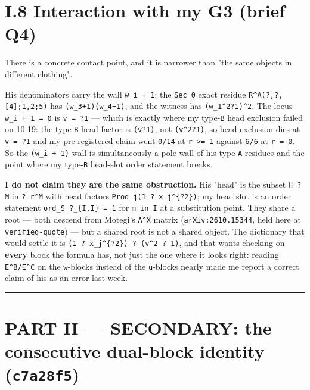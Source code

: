 \documentclass[11pt,a4paper]{article}
\begin{document}
\section*{I.8 Interaction with my G3 (brief Q4)}

There is a concrete contact point, and it is narrower than "the same objects in different clothing".

His denominators carry the wall \mbox{\texttt{w\_i + 1}}: the \mbox{\texttt{Sec 0}} exact residue \mbox{\texttt{R\textasciicircum{}A(?,?,[4];1,2;5)}} has \mbox{\texttt{(w\_3+1)(w\_4+1)}}, and the witness has \mbox{\texttt{(w\_1\textasciicircum{}2?1)\textasciicircum{}2}}. The locus \mbox{\texttt{w\_i + 1 = 0}} is \mbox{\texttt{v = ?1}} --- which is exactly where my type-\mbox{\texttt{B}} head exclusion failed on 10-19: the type-\mbox{\texttt{B}} head factor is \mbox{\texttt{(v?1)}}, not \mbox{\texttt{(v\textasciicircum{}2?1)}}, so head exclusion dies at \mbox{\texttt{v = ?1}} and my pre-registered claim went \mbox{\texttt{0/14}} at \mbox{\texttt{r >= 1}} against \mbox{\texttt{6/6}} at \mbox{\texttt{r = 0}}. So the \mbox{\texttt{(w\_i + 1)}} wall is simultaneously a pole wall of his type-\mbox{\texttt{A}} residues and the point where my type-\mbox{\texttt{B}} head-slot order statement breaks.

\textbf{I do not claim they are the same obstruction.} His "head" is the subset \mbox{\texttt{H ? M}} in \mbox{\texttt{?\_r\textasciicircum{}M}} with head factors \mbox{\texttt{Prod\_j(1 ? x\_j\textasciicircum{}\{?2\})}}; my head slot is an order statement \mbox{\texttt{ord\_S ?\_\{I,I\} = 1}} for \mbox{\texttt{m in I}} at a substitution point. They share a root --- both descend from Motegi's \mbox{\texttt{A\textasciicircum{}X}} matrix (\mbox{\texttt{arXiv:2610.15344}}, held here at \mbox{\texttt{verified-quote}}) --- but a shared root is not a shared object. The dictionary that would settle it is \mbox{\texttt{(1 ? x\_j\textasciicircum{}\{?2\}) ? (v\textasciicircum{}2 ? 1)}}, and that wants checking on \textbf{every} block the formula has, not just the one where it looks right: reading \mbox{\texttt{E\textasciicircum{}B/E\textasciicircum{}C}} on the \mbox{\texttt{w}}-blocks instead of the \mbox{\texttt{u}}-blocks nearly made me report a correct claim of his as an error last week.

\medskip\hrule\medskip

\section*{PART II --- SECONDARY: the consecutive dual-block identity (\mbox{\texttt{c7a28f5}})}
\end{document}
